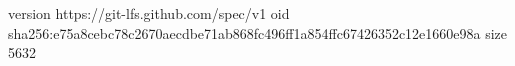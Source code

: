 version https://git-lfs.github.com/spec/v1
oid sha256:e75a8cebc78c2670aecdbe71ab868fc496ff1a854ffc67426352c12e1660e98a
size 5632
